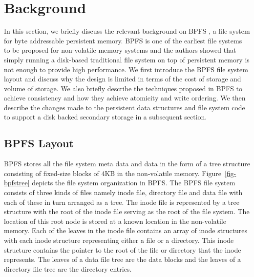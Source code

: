 \section{Background}
\label{sec-bg}
In this section, we briefly discuss the relevant background on BPFS \cite{c10}, a file system for byte addressable persistent memory. BPFS is one of the earliest file systems to be proposed for non-volatile memory systems and the authors showed that simply running a disk-based traditional file system on top of persistent memory is not enough to provide high performance. We first introduce the BPFS file system layout and discuss why the design is limited in terms of the cost of storage and volume of storage. We also briefly describe the techniques proposed in BPFS to achieve consistency and how they achieve atomicity and write ordering. We then describe the changes made to the persistent data structures and file system code to support a disk backed secondary storage in a subsequent section.

\subsection{BPFS Layout}
BPFS stores all the file system meta data and data in the form of a tree structure consisting of fixed-size blocks of 4KB in the non-volatile memory. Figure~\ref{fig-bpfstree} depicts the file system organization in BPFS. The BPFS file system consists of three kinds of files namely inode file, directory file and data file with each of these in turn arranged as a tree. The inode file is represented by a tree structure with the root of the inode file serving as the root of the file system. The location of this root node is stored at a known location in the non-volatile memory. Each of the leaves in the inode file contains an array of inode structures with each inode structure representing either a file or a directory. This inode structure contains the pointer to the root of the file or directory that the inode represents. The leaves of a data file tree are the data blocks and the leaves of a directory file tree are the directory entries.

